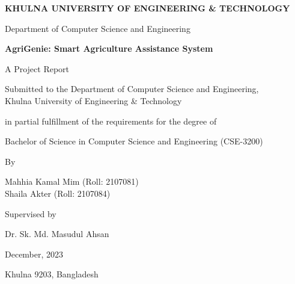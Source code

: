 \documentclass[12pt,a4paper]{report}
\begin{document}
\thispagestyle{empty}
\begin{center}
    \vspace*{0.5cm}
    
    {\fontsize{14}{16}\selectfont \textbf{KHULNA UNIVERSITY OF ENGINEERING \& TECHNOLOGY}}
    
    \vspace{0.3cm}
    
    {\fontsize{12}{14}\selectfont Department of Computer Science and Engineering}
    
    \vspace{1.5cm}
    
    {\fontsize{16}{19}\selectfont \textbf{AgriGenie: Smart Agriculture Assistance System}}
    
    \vspace{2cm}
    
    {\fontsize{12}{14}\selectfont A Project Report}
    
    \vspace{0.3cm}
    
    {\fontsize{12}{14}\selectfont Submitted to the Department of Computer Science and Engineering, \\ 
    Khulna University of Engineering \& Technology}
    
    \vspace{1cm}
    
    {\fontsize{12}{14}\selectfont in partial fulfillment of the requirements for the degree of}
    
    \vspace{0.3cm}
    
    {\fontsize{12}{14}\selectfont Bachelor of Science in Computer Science and Engineering (CSE-3200)}
    
    \vspace{2cm}
    
    {\fontsize{12}{14}\selectfont By}
    
    \vspace{0.5cm}
    
    {\fontsize{12}{14}\selectfont Mahhia Kamal Mim (Roll: 2107081) \\
    Shaila Akter (Roll: 2107084)}
    
    \vspace{2cm}
    
    {\fontsize{12}{14}\selectfont Supervised by}
    
    \vspace{0.3cm}
    
    {\fontsize{12}{14}\selectfont Dr. Sk. Md. Masudul Ahsan}
    
    \vspace{2cm}
    
    {\fontsize{12}{14}\selectfont December, 2023}
    
    \vspace{0.5cm}
    
    {\fontsize{12}{14}\selectfont Khulna 9203, Bangladesh}
    
\end{center}
\end{document}
